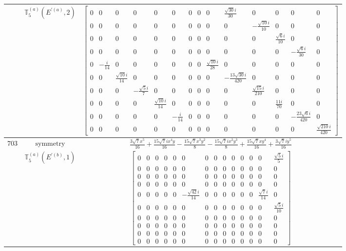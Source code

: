 \documentclass[fleqn,8pt,landscape]{jsarticle}
\begin{document}
\begin{longtable}{ccc}
$  $ & $ \mathbb{T}_{5}^{(a)}(E^{\prime(a)},2) $ & $ \begin{bmatrix} 0 & 0 & 0 & 0 & 0 & 0 & 0 & 0 & 0 & \frac{\sqrt{30} i}{30} & 0 & 0 & 0 & 0 \\ 0 & 0 & 0 & 0 & 0 & 0 & 0 & 0 & 0 & 0 & - \frac{\sqrt{10} i}{10} & 0 & 0 & 0 \\ 0 & 0 & 0 & 0 & 0 & 0 & 0 & 0 & 0 & 0 & 0 & \frac{\sqrt{6} i}{10} & 0 & 0 \\ 0 & 0 & 0 & 0 & 0 & 0 & 0 & 0 & 0 & 0 & 0 & 0 & - \frac{\sqrt{6} i}{30} & 0 \\ 0 & - \frac{i}{14} & 0 & 0 & 0 & 0 & 0 & 0 & \frac{\sqrt{10} i}{28} & 0 & 0 & 0 & 0 & 0 \\ 0 & 0 & \frac{\sqrt{10} i}{14} & 0 & 0 & 0 & 0 & 0 & 0 & - \frac{13 \sqrt{30} i}{420} & 0 & 0 & 0 & 0 \\ 0 & 0 & 0 & - \frac{\sqrt{5} i}{7} & 0 & 0 & 0 & 0 & 0 & 0 & \frac{\sqrt{15} i}{210} & 0 & 0 & 0 \\ 0 & 0 & 0 & 0 & \frac{\sqrt{10} i}{14} & 0 & 0 & 0 & 0 & 0 & 0 & \frac{11 i}{70} & 0 & 0 \\ 0 & 0 & 0 & 0 & 0 & - \frac{i}{14} & 0 & 0 & 0 & 0 & 0 & 0 & - \frac{23 \sqrt{6} i}{420} & 0 \\ 0 & 0 & 0 & 0 & 0 & 0 & 0 & 0 & 0 & 0 & 0 & 0 & 0 & \frac{\sqrt{210} i}{420} \end{bmatrix} $ \\ \hline
$ 703 $ & $ \text{symmetry} $ & $ \frac{3 \sqrt{7} x^{5}}{16} + \frac{15 \sqrt{7} i x^{4} y}{16} - \frac{15 \sqrt{7} x^{3} y^{2}}{8} - \frac{15 \sqrt{7} i x^{2} y^{3}}{8} + \frac{15 \sqrt{7} x y^{4}}{16} + \frac{3 \sqrt{7} i y^{5}}{16} $ \\
$  $ & $ \mathbb{T}_{5}^{(a)}(E^{\prime(b)},1) $ & $ \begin{bmatrix} 0 & 0 & 0 & 0 & 0 & 0 & 0 & 0 & 0 & 0 & 0 & 0 & 0 & \frac{\sqrt{5} i}{5} \\ 0 & 0 & 0 & 0 & 0 & 0 & 0 & 0 & 0 & 0 & 0 & 0 & 0 & 0 \\ 0 & 0 & 0 & 0 & 0 & 0 & 0 & 0 & 0 & 0 & 0 & 0 & 0 & 0 \\ 0 & 0 & 0 & 0 & 0 & 0 & 0 & 0 & 0 & 0 & 0 & 0 & 0 & 0 \\ 0 & 0 & 0 & 0 & 0 & - \frac{\sqrt{42} i}{14} & 0 & 0 & 0 & 0 & 0 & 0 & \frac{\sqrt{7} i}{14} & 0 \\ 0 & 0 & 0 & 0 & 0 & 0 & 0 & 0 & 0 & 0 & 0 & 0 & 0 & \frac{\sqrt{5} i}{10} \\ 0 & 0 & 0 & 0 & 0 & 0 & 0 & 0 & 0 & 0 & 0 & 0 & 0 & 0 \\ 0 & 0 & 0 & 0 & 0 & 0 & 0 & 0 & 0 & 0 & 0 & 0 & 0 & 0 \\ 0 & 0 & 0 & 0 & 0 & 0 & 0 & 0 & 0 & 0 & 0 & 0 & 0 & 0 \\ 0 & 0 & 0 & 0 & 0 & 0 & 0 & 0 & 0 & 0 & 0 & 0 & 0 & 0 \end{bmatrix} $ \\ \hline

\end{longtable}
\end{document}

